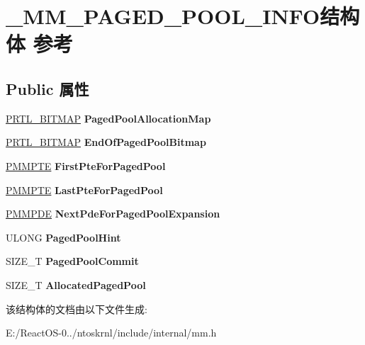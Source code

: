 \hypertarget{struct___m_m___p_a_g_e_d___p_o_o_l___i_n_f_o}{}\section{\+\_\+\+M\+M\+\_\+\+P\+A\+G\+E\+D\+\_\+\+P\+O\+O\+L\+\_\+\+I\+N\+F\+O结构体 参考}
\label{struct___m_m___p_a_g_e_d___p_o_o_l___i_n_f_o}
\subsection*{Public 属性}
\begin{DoxyCompactItemize}
\item 
\mbox{\label{struct___m_m___p_a_g_e_d___p_o_o_l___i_n_f_o_a896bb97cbaf1aa544b24c55416eceaca}} 
\hyperlink{struct___r_t_l___b_i_t_m_a_p}{P\+R\+T\+L\+\_\+\+B\+I\+T\+M\+AP} {\bfseries Paged\+Pool\+Allocation\+Map}
\item 
\mbox{\label{struct___m_m___p_a_g_e_d___p_o_o_l___i_n_f_o_a3e24080214de3ceff4133586b6f672da}} 
\hyperlink{struct___r_t_l___b_i_t_m_a_p}{P\+R\+T\+L\+\_\+\+B\+I\+T\+M\+AP} {\bfseries End\+Of\+Paged\+Pool\+Bitmap}
\item 
\mbox{\label{struct___m_m___p_a_g_e_d___p_o_o_l___i_n_f_o_a8ec9ea188ec4f17e5ffcbc08950bf002}} 
\hyperlink{struct___m_m_p_t_e}{P\+M\+M\+P\+TE} {\bfseries First\+Pte\+For\+Paged\+Pool}
\item 
\mbox{\label{struct___m_m___p_a_g_e_d___p_o_o_l___i_n_f_o_a1caf5664dc271e0087f1f10caee79dbe}} 
\hyperlink{struct___m_m_p_t_e}{P\+M\+M\+P\+TE} {\bfseries Last\+Pte\+For\+Paged\+Pool}
\item 
\mbox{\label{struct___m_m___p_a_g_e_d___p_o_o_l___i_n_f_o_a8eba95bca720dd83b0b0017fa8702af8}} 
\hyperlink{struct___m_m_p_t_e}{P\+M\+M\+P\+DE} {\bfseries Next\+Pde\+For\+Paged\+Pool\+Expansion}
\item 
\mbox{\label{struct___m_m___p_a_g_e_d___p_o_o_l___i_n_f_o_af988b56e1d82758c095ea9a0899b8f3e}} 
U\+L\+O\+NG {\bfseries Paged\+Pool\+Hint}
\item 
\mbox{\label{struct___m_m___p_a_g_e_d___p_o_o_l___i_n_f_o_afbe985147147d4f85a473949badee0eb}} 
S\+I\+Z\+E\+\_\+T {\bfseries Paged\+Pool\+Commit}
\item 
\mbox{\label{struct___m_m___p_a_g_e_d___p_o_o_l___i_n_f_o_a21cc9bfff18ae596c45d128934b2b93b}} 
S\+I\+Z\+E\+\_\+T {\bfseries Allocated\+Paged\+Pool}
\end{DoxyCompactItemize}


该结构体的文档由以下文件生成\+:\begin{DoxyCompactItemize}
\item 
E\+:/\+React\+O\+S-\/0../ntoskrnl/include/internal/mm.\+h\end{DoxyCompactItemize}
